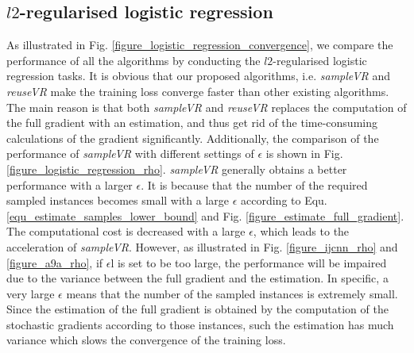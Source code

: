 \documentclass[letterpaper]{article}
\begin{document}
\subsection{$l2$-regularised logistic regression}
\label{sect_performance_evaluation_convergence}
As illustrated in Fig. \ref{figure_logistic_regression_convergence}, we compare the performance of all the algorithms by conducting the $l2$-regularised logistic regression tasks.  It is obvious that our proposed algorithms, i.e. \emph{sampleVR} and \emph{reuseVR} make the training loss converge faster than other existing algorithms.  The main reason is that  both \emph{sampleVR} and \emph{reuseVR} replaces  the computation of the full gradient with an estimation, and thus get rid of the time-consuming calculations of the gradient significantly.  Additionally, the comparison of the  performance of \emph{sampleVR} with different settings of $\epsilon$ is shown  in Fig. \ref{figure_logistic_regression_rho}. \emph{sampleVR} generally obtains a better performance with a larger $\epsilon$. It is because that the number of the required sampled instances becomes small with a large $\epsilon$ according to Equ. \ref{equ_estimate_samples_lower_bound} and Fig. \ref{figure_estimate_full_gradient}. The computational cost is decreased with a large $\epsilon$, which leads to the acceleration of \emph{sampleVR}. However, as illustrated in Fig. \ref{figure_ijcnn_rho} and \ref{figure_a9a_rho}, if $\epsilon$l is set to be too large, the performance will be impaired due to the variance between the full gradient and the estimation. In specific, a very large $\epsilon$  means that the number of the sampled instances is extremely small. Since the estimation of the full gradient is obtained by the computation of the stochastic gradients according to those instances,  such the estimation has much variance which slows the convergence of the training loss. 
\end{document}
